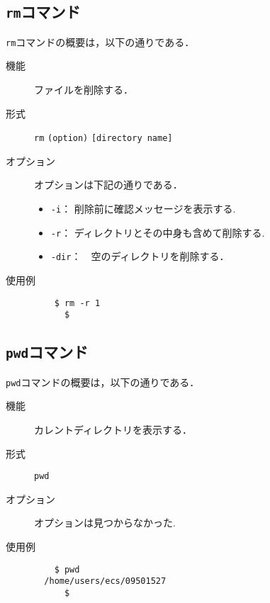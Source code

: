 \documentclass[a4j,11pt]{jarticle}
\begin{document}
\subsection{\texttt{rm}コマンド}
\verb|rm|コマンドの概要は，以下の通りである．
\begin{description}
  \item[機能] %
    ファイルを削除する．
  \item[形式] %
    \verb|rm| \verb|(option)| \verb|[directory name]|
  \item[オプション] %
    オプションは下記の通りである．
    \begin{itemize}
      \item \verb|-i|：  削除前に確認メッセージを表示する.
      \item \verb|-r|：  ディレクトリとその中身も含めて削除する.
      \item \verb|-dir|：　空のディレクトリを削除する．
    \end{itemize}
  \item[使用例] %
    \begin{verbatim}
    $ rm -r 1
      $
    \end{verbatim}
\end{description}

\subsection{\texttt{pwd}コマンド}
\verb|pwd|コマンドの概要は，以下の通りである．
\begin{description}
  \item[機能] %
    カレントディレクトリを表示する．
  \item[形式] %
    \verb|pwd|
  \item[オプション] %
    オプションは見つからなかった.
  \item[使用例] %
    \begin{verbatim}
    $ pwd
  /home/users/ecs/09501527
      $
    \end{verbatim}
\end{description}
\end{document}
